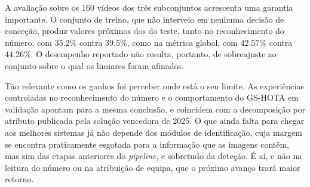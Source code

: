 A avaliação sobre os $160$ vídeos dos três subconjuntos acrescenta uma garantia importante.
O conjunto de treino, que não interveio em nenhuma decisão de conceção, produz valores
próximos dos do teste, tanto no reconhecimento do número, com $35.2\%$ contra $39.5\%$, como
na métrica global, com $42.57\%$ contra $44.26\%$. O desempenho reportado não resulta,
portanto, de sobreajuste ao conjunto sobre o qual os limiares foram afinados.

Tão relevante como os ganhos foi perceber onde está o seu limite. As experiências controladas
no reconhecimento do número e o comportamento do GS-HOTA em validação apontam para a mesma
conclusão, e coincidem com a decomposição por atributo publicada pela solução vencedora de
2025. O que ainda falta para chegar aos melhores sistemas já não depende dos módulos de
identificação, cuja margem se encontra praticamente esgotada para a informação que as imagens
contêm, mas sim das etapas anteriores do \emph{pipeline}, e sobretudo da deteção. É aí, e não
na leitura do número ou na atribuição de equipa, que o próximo avanço trará maior retorno.

